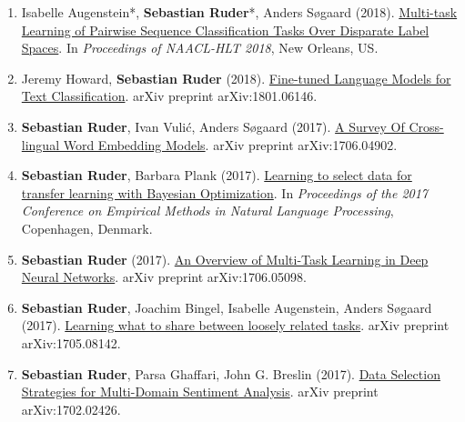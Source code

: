 \documentclass[10pt,letterpaper]{article}
\begin{document}
\begin{enumerate}
	\parskip=0.1em
	
	\item Isabelle Augenstein*, \textbf{Sebastian Ruder}*, Anders Søgaard (2018). \href{https://arxiv.org/abs/1802.09913}{Multi-task Learning of Pairwise Sequence Classification Tasks Over Disparate Label Spaces}. In \textit{Proceedings of NAACL-HLT 2018}, New Orleans, US. 
	
	\newenvironment{starfootnotes}
  {\par\edef\savedfootnotenumber{\number\value{footnote}}
   \renewcommand{\thefootnote}{$\star$} 
   \setcounter{footnote}{0}}
  {\par\setcounter{footnote}{\savedfootnotenumber}}
	
\begin{starfootnotes}
\end{starfootnotes}
	
	\item Jeremy Howard, \textbf{Sebastian Ruder} (2018). \href{https://arxiv.org/abs/1801.06146}{Fine-tuned Language Models for Text Classification}. arXiv preprint arXiv:1801.06146.
	
	\item \textbf{Sebastian Ruder}, Ivan Vulić, Anders Søgaard (2017). \href{https://arxiv.org/abs/1706.04902}{A Survey Of Cross-lingual Word Embedding Models}. arXiv preprint arXiv:1706.04902.
	
	\item \textbf{Sebastian Ruder}, Barbara Plank (2017). \href{https://arxiv.org/abs/1707.05246}{Learning to select data for transfer learning with Bayesian Optimization}. In \textit{Proceedings of the 2017 Conference on Empirical Methods in Natural Language Processing}, Copenhagen, Denmark.
	
	\item \textbf{Sebastian Ruder} (2017). \href{https://arxiv.org/abs/1706.05098}{An Overview of Multi-Task Learning in Deep Neural Networks}. arXiv preprint arXiv:1706.05098.
	
	\item \textbf{Sebastian Ruder}, Joachim Bingel, Isabelle Augenstein, Anders Søgaard (2017). \href{https://arxiv.org/abs/1705.08142}{Learning what to share between loosely related tasks}. arXiv preprint arXiv:1705.08142.
	
	\item \textbf{Sebastian Ruder}, Parsa Ghaffari, John G. Breslin (2017). \href{https://arxiv.org/abs/1702.02426}{Data Selection Strategies for Multi-Domain Sentiment Analysis}. arXiv preprint arXiv:1702.02426.
	

\end{enumerate}
\end{document}
